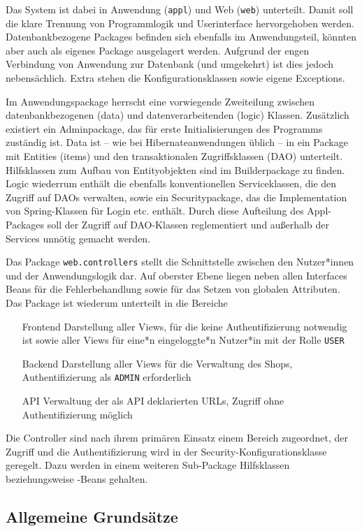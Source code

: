 Das System ist dabei in Anwendung (\lstinline|appl|) und Web (\lstinline|web|) unterteilt. Damit soll die klare Trennung von Programmlogik und Userinterface hervorgehoben werden. Datenbankbezogene Packages befinden sich ebenfalls im Anwendungsteil, könnten aber auch als eigenes Package ausgelagert werden. Aufgrund der engen Verbindung von Anwendung zur Datenbank (und umgekehrt) ist dies jedoch nebensächlich. Extra stehen die Konfigurationsklassen sowie eigene Exceptions.

Im Anwendungspackage herrscht eine vorwiegende Zweiteilung zwischen datenbankbezogenen (data) und datenverarbeitenden (logic) Klassen. Zusätzlich existiert ein Adminpackage, das für erste Initialisierungen des Programms zuständig ist. Data ist -- wie bei Hibernateanwendungen üblich -- in ein Package mit Entities (items) und den transaktionalen Zugriffsklassen (DAO) unterteilt. Hilfsklassen zum Aufbau von Entityobjekten sind im Builderpackage zu finden. Logic wiederrum enthält die ebenfalls konventionellen Serviceklassen, die den Zugriff auf DAOs verwalten, sowie ein Securitypackage, das die Implementation von Spring-Klassen für Login etc. enthält. Durch diese Aufteilung des Appl-Packages soll der Zugriff auf DAO-Klassen reglementiert und außerhalb der Services unnötig gemacht werden.

Das Package \lstinline|web.controllers| stellt die Schnittstelle zwischen den Nutzer*innen und der Anwendungslogik dar. Auf oberster Ebene liegen neben allen Interfaces Beans für die Fehlerbehandlung sowie für das Setzen von globalen Attributen. Das Package ist wiederum unterteilt in die Bereiche
\begin{itemize}
	\item[Frontend] Darstellung aller Views, für die keine Authentifizierung notwendig ist sowie aller Views für eine*n eingeloggte*n Nutzer*in mit der Rolle \lstinline|USER|
	\item[Backend] Darstellung aller Views für die Verwaltung des Shops, Authentifizierung als \lstinline|ADMIN| erforderlich
	\item[API] Verwaltung der als API deklarierten URLs, Zugriff ohne Authentifizierung möglich
\end{itemize}
Die Controller sind nach ihrem primären Einsatz einem Bereich zugeordnet, der Zugriff und die Authentifizierung wird in der Security-Konfigurationsklasse geregelt. Dazu werden in einem weiteren Sub-Package Hilfsklassen beziehungsweise -Beans gehalten.

\subsection{Allgemeine Grundsätze}


